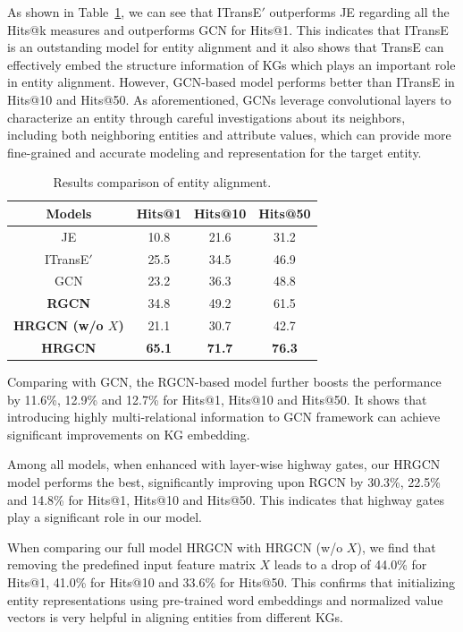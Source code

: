 	As shown in Table~\ref{f1}, we can see that ITransE$'$ outperforms JE regarding all the Hits@k measures and outperforms GCN for Hits@1. This indicates that ITransE is an outstanding model for entity alignment and it also shows that TransE can effectively embed the structure information of KGs which plays an important role in entity alignment. However, GCN-based model performs better than ITransE in Hits@10 and Hits@50. As aforementioned, GCNs leverage convolutional layers to characterize an entity through careful investigations about its neighbors, including both neighboring entities and attribute values, which can provide more fine-grained and accurate modeling and representation for the target entity. 
	\begin{table}
		\centering
		\begin{tabular}{cccc}
			\toprule
			\bf Models & Hits@1 & Hits@10 & Hits@50 \\
			\midrule
			JE & 10.8 & 21.6 & 31.2 \\
			ITransE$'$ & 25.5 & 34.5 & 46.9 \\
			GCN & 23.2 & 36.3 & 48.8 \\
			\bf RGCN & 34.8 & 49.2 & 61.5 \\
			\bf HRGCN (w/o $X$) & 21.1 & 30.7 & 42.7  \\
			\bf HRGCN & \bf 65.1 & \bf 71.7 & \bf 76.3 \\
			\bottomrule
		\end{tabular}
		\caption{Results comparison of entity alignment.}
		\label{f1}
	\end{table}
	Comparing with GCN, the RGCN-based model further boosts the performance by 11.6\%, 12.9\% and 12.7\% for Hits@1, Hits@10 and Hits@50. It shows that introducing highly multi-relational information to GCN framework can achieve significant improvements on KG embedding.
	 
	Among all models, when enhanced with layer-wise highway gates, our HRGCN model performs the best, significantly improving upon RGCN by 30.3\%, 22.5\% and 14.8\% for Hits@1, Hits@10 and Hits@50. This indicates that highway gates play a significant role in our model.
	
	When comparing our full model HRGCN with HRGCN (w/o $X$), we find that removing the predefined input feature matrix $X$ leads to a drop of 44.0\% for Hits@1, 41.0\% for Hits@10 and 33.6\% for Hits@50. This confirms that initializing entity representations using pre-trained word embeddings and normalized value vectors is very helpful in aligning entities from different KGs. 
	
